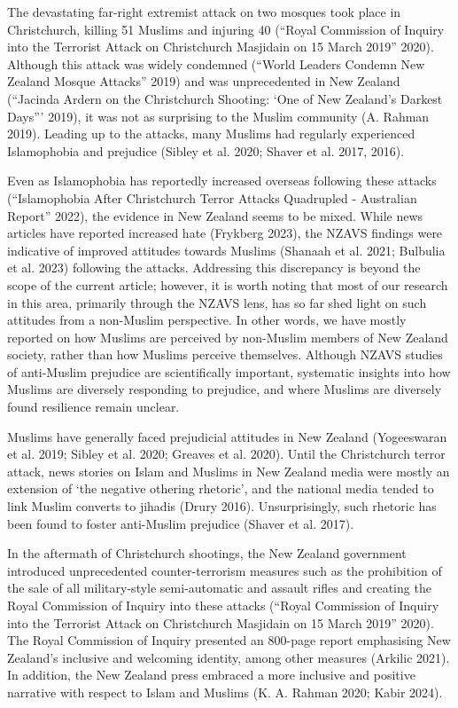 \documentclass[
]{interact}
\begin{document}
The devastating far-right extremist attack on two mosques took place in
Christchurch, killing 51 Muslims and injuring 40 ({``Royal {C}ommission
of {I}nquiry into the Terrorist Attack on {C}hristchurch {M}asjidain on
15 {M}arch 2019''} 2020). Although this attack was widely condemned
({``World Leaders Condemn New Zealand Mosque Attacks''} 2019) and was
unprecedented in New Zealand ({``Jacinda {A}rdern on the {C}hristchurch
Shooting: {`}One of {N}ew {Z}ealand's Darkest Days'''} 2019), it was not
as surprising to the Muslim community (A. Rahman 2019). Leading up to
the attacks, many Muslims had regularly experienced Islamophobia and
prejudice (Sibley et al. 2020; Shaver et al. 2017, 2016).

Even as Islamophobia has reportedly increased overseas following these
attacks ({``Islamophobia After {C}hristchurch Terror Attacks Quadrupled
- {A}ustralian Report''} 2022), the evidence in New Zealand seems to be
mixed. While news articles have reported increased hate (Frykberg 2023),
the NZAVS findings were indicative of improved attitudes towards Muslims
(Shanaah et al. 2021; Bulbulia et al. 2023) following the attacks.
Addressing this discrepancy is beyond the scope of the current article;
however, it is worth noting that most of our research in this area,
primarily through the NZAVS lens, has so far shed light on such
attitudes from a non-Muslim perspective. In other words, we have mostly
reported on how Muslims are perceived by non-Muslim members of New
Zealand society, rather than how Muslims perceive themselves. Although
NZAVS studies of anti-Muslim prejudice are scientifically important,
systematic insights into how Muslims are diversely responding to
prejudice, and where Muslims are diversely found resilience remain
unclear.

Muslims have generally faced prejudicial attitudes in New Zealand
(Yogeeswaran et al. 2019; Sibley et al. 2020; Greaves et al. 2020).
Until the Christchurch terror attack, news stories on Islam and Muslims
in New Zealand media were mostly an extension of `the negative othering
rhetoric', and the national media tended to link Muslim converts to
jihadis (Drury 2016). Unsurprisingly, such rhetoric has been found to
foster anti-Muslim prejudice (Shaver et al. 2017).

In the aftermath of Christchurch shootings, the New Zealand government
introduced unprecedented counter-terrorism measures such as the
prohibition of the sale of all military-style semi-automatic and assault
rifles and creating the Royal Commission of Inquiry into these attacks
({``Royal {C}ommission of {I}nquiry into the Terrorist Attack on
{C}hristchurch {M}asjidain on 15 {M}arch 2019''} 2020). The Royal
Commission of Inquiry presented an 800-page report emphasising New
Zealand's inclusive and welcoming identity, among other measures
(Arkilic 2021). In addition, the New Zealand press embraced a more
inclusive and positive narrative with respect to Islam and Muslims (K.
A. Rahman 2020; Kabir 2024).
\end{document}
